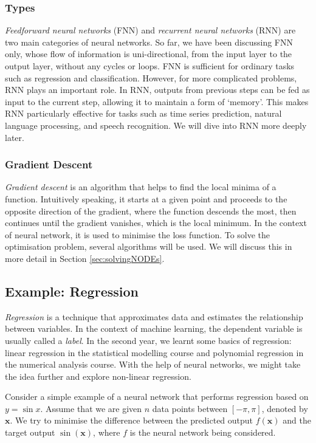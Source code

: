 \documentclass[a4paper,11pt,titlepage]{article}
\theoremstyle{definition}
\theoremstyle{plain}
\theoremstyle{remark}
\begin{document}
\subsubsection{Types}

\textit{Feedforward neural networks} (FNN) and \textit{recurrent neural networks} (RNN) are two main categories of neural networks. So far, we have been discussing FNN only, whose flow of information is uni-directional, from the input layer to the output layer, without any cycles or loops. FNN is sufficient for ordinary tasks such as regression and classification. However, for more complicated problems, RNN plays an important role. In RNN, outputs from previous steps can be fed as input to the current step, allowing it to maintain a form of ‘memory’. This makes RNN particularly effective for tasks such as time series prediction, natural language processing, and speech recognition. We will dive into RNN more deeply later.

\subsubsection{Gradient Descent}

\textit{Gradient descent} is an algorithm that helps to find the local minima of a function. Intuitively speaking, it starts at a given point and proceeds to the opposite direction of the gradient, where the function descends the most, then continues until the gradient vanishes, which is the local minimum. In the context of neural network, it is used to minimise the loss function. To solve the optimisation problem, several algorithms will be used. We will discuss this in more detail in Section \ref{sec:solvingNODEs}.

\subsection{Example: Regression}

\textit{Regression} is a technique that approximates data and estimates the relationship between variables. In the context of machine learning, the dependent variable is usually called a \textit{label}. In the second year, we learnt some basics of regression: linear regression in the statistical modelling course and polynomial regression in the numerical analysis course. With the help of neural networks, we might take the idea further and explore non-linear regression.

Consider a simple example of a neural network that performs regression based on $y = \sin x$. Assume that we are given $n$ data points between $[-\pi, \pi]$, denoted by $\mathbf{x}$. We try to minimise the difference between the predicted output $f(\mathbf{x})$ and the target output $\sin (\mathbf{x})$, where $f$ is the neural network being considered.
\end{document}
